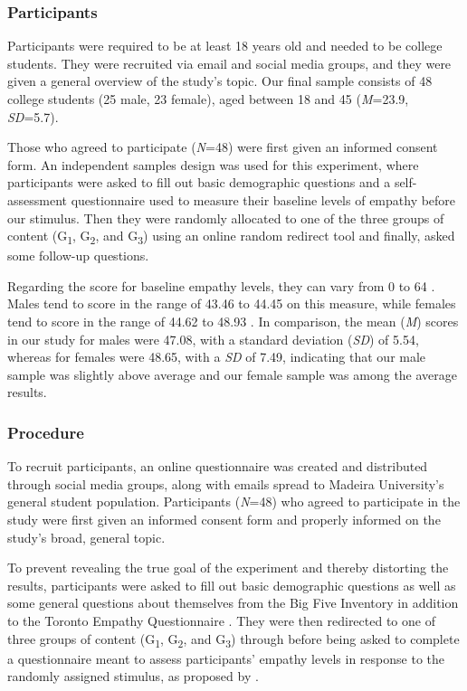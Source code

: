 \subsubsection{Participants}
Participants were required to be at least 18 years old and needed to be college students. They were recruited via email and social media groups, and they were given a general overview of the study's topic. Our final sample consists of 48 college students (25 male, 23 female), aged between 18 and 45 (\textit{M}=23.9, \textit{SD}=5.7).

Those who agreed to participate (\textit{N}=48) were first given an informed consent form. An independent samples design was used for this experiment, where participants were asked to fill out basic demographic questions and a self-assessment questionnaire \cite{SPR03} used to measure their baseline levels of empathy before our stimulus. Then they were randomly allocated to one of the three groups of content (G\textsubscript{1}, G\textsubscript{2}, and G\textsubscript{3}) using an online random redirect tool \cite{FER19} and finally, asked some follow-up questions.

Regarding the score for baseline empathy levels, they can vary from 0 to 64 \cite{SPR09}. Males tend to score in the range of 43.46 to 44.45 on this measure, while females tend to score in the range of 44.62 to 48.93 \cite{SPR09}. In comparison, the mean (\textit{M}) scores in our study for males were 47.08, with a standard deviation (\textit{SD}) of 5.54, whereas for females were 48.65, with a \textit{SD} of 7.49, indicating that our male sample was slightly above average and our female sample was among the average results.

\subsubsection{Procedure}
To recruit participants, an online questionnaire was created and distributed through social media groups, along with emails spread to Madeira University's general student population. Participants (\textit{N}=48) who agreed to participate in the study were first given an informed consent form and properly informed on the study's broad, general topic. 

To prevent revealing the true goal of the experiment and thereby distorting the results, participants were asked to fill out basic demographic questions as well as some general questions about themselves from the Big Five Inventory \cite{JOH91} in addition to the Toronto Empathy Questionnaire \cite{SPR03}. They were then redirected to one of three groups of content (G\textsubscript{1}, G\textsubscript{2}, and G\textsubscript{3}) through \cite{FER19} before being asked to complete a questionnaire meant to assess participants' empathy levels in response to the randomly assigned stimulus, as proposed by \cite{ROT19, ZIB19}.

